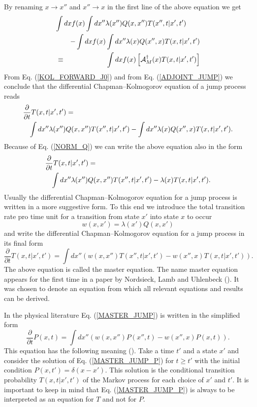 By renaming $x \rightarrow x''$ and $x'' \rightarrow x$  in the first line of the
above equation we get
\begin{eqnarray}
\label{ADJOINT_JUMP}
\lefteqn{\int dx  f(x) \int dx'' \lambda(x'')  Q(x,x'') T(x'',t|x',t')}
     \nonumber \\
& & - \int dx f(x) \int dx'' \lambda(x)  Q(x'',x) T(x,t|x',t') \nonumber \\
& \equiv & \int dx f(x) \left[ {\cal{A}}_M^{\dagger}(x) 
          T(x,t|x',t')      \right]
\end{eqnarray}
From Eq. (\ref{KOL_FORWARD_J0}) and from Eq. (\ref{ADJOINT_JUMP}) 
we conclude that the differential Chapman--Kolmogorov equation 
of a jump process
reads
\begin{eqnarray} 
\label{KOL_FORWARD_J1}
\lefteqn{\frac{\partial}{\partial t} T(x,t|x',t') =} \nonumber \\ 
&& \int dx'' \lambda(x'') Q(x,x'') T(x'',t|x',t')
 - \int dx'' \lambda(x) Q(x'',x) T(x,t|x',t').
\end{eqnarray}
Because of Eq. (\ref{NORM_Q}) we can write the above equation also 
in the form
\begin{eqnarray} 
\label{KOL_FORWARD_J2}
\lefteqn{\frac{\partial}{\partial t} T(x,t|x',t') =} \nonumber \\ 
&& \int dx'' \lambda(x'') Q(x,x'') T(x'',t|x',t')
 - \lambda(x) T(x,t|x',t').
\end{eqnarray}
Usually the differential Chapman--Kolmogorov equation for a jump process is 
written in a more suggestive form. To this end we introduce the 
total transition rate pro time unit for a transition from state $x'$ 
into  state $x$ to occur
\begin{equation*}
w(x,x') = \lambda(x') Q(x,x')
\end{equation*}
and write the differential Chapman--Kolmogorov equation 
for a jump process in its final form
\begin{equation}
\label{MASTER_JUMP}
\frac{\partial}{\partial t} T(x,t|x',t') =
 \int dx'' \left( w(x,x'') T(x'',t|x',t')
 - w(x'',x) T(x,t|x',t') \right).
\end{equation}
The above equation is called the master equation. 
The name master equation appears for the first time in a paper by
Nordsieck, Lamb and Uhlenbeck (\cite{NORDSIECK}). 
It was chosen to denote an equation from which
all relevant equations and results can be derived. 

In the physical literature Eq. (\ref{MASTER_JUMP}) is written in 
the simplified form
\begin{equation}
\label{MASTER_JUMP_P}
\frac{\partial}{\partial t} P(x,t) =
 \int dx'' \left( w(x,x'') P(x'',t)
 - w(x'',x) P(x,t) \right).
\end{equation}
This equation has the following meaning (\cite{VAN_KAMPEN}). Take a 
time $t'$ and a state $x'$ and consider 
the solution of Eq. (\ref{MASTER_JUMP_P})
for $t \ge t'$ with the initial condition $P(x,t') = 
\delta(x-x')$. This solution is the conditional transition 
probability $T(x,t|x',t')$ of the Markov process for each choice
of $x'$ and $t'$. It is important to keep in mind that 
Eq. (\ref{MASTER_JUMP_P})
is always to be interpreted as an equation for $T$ and not for 
$P$.

